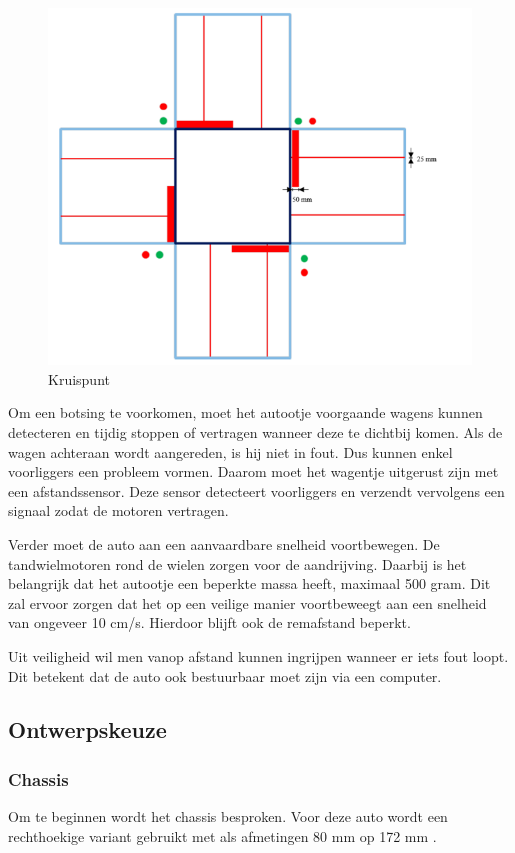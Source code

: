 \documentclass[a4paper,twoside,kulak]{kulakreport} %
\begin{document}
\begin{figure}
	\centering
	\includegraphics[width=.6\textwidth]{volglijnenEnStoplijnen}
	\caption{Kruispunt}
	\label{fig:plattegrond}
\end{figure}

Om een botsing te voorkomen, moet het autootje voorgaande wagens kunnen detecteren en tijdig stoppen of vertragen wanneer deze te dichtbij komen. Als de wagen achteraan wordt aangereden, is hij niet in fout. Dus kunnen enkel voorliggers een probleem vormen. Daarom moet het wagentje uitgerust zijn met een afstandssensor. Deze sensor detecteert voorliggers en verzendt vervolgens een signaal zodat de motoren vertragen. 

Verder moet de auto aan een aanvaardbare snelheid voortbewegen. De tandwielmotoren rond de wielen zorgen voor de aandrijving. Daarbij is het belangrijk dat het autootje een beperkte massa heeft, maximaal 500 gram. Dit zal ervoor zorgen dat het op een veilige manier voortbeweegt aan een snelheid van ongeveer 10 cm/s. Hierdoor blijft ook de remafstand beperkt.

Uit veiligheid wil men vanop afstand kunnen ingrijpen wanneer er iets fout loopt. Dit betekent dat de auto ook bestuurbaar moet zijn via een computer. 



\subsection{Ontwerpskeuze}
\label{Ontwerpskeuze}

\subsubsection{Chassis}
Om te beginnen wordt het chassis besproken. Voor deze auto wordt een rechthoekige variant gebruikt met als afmetingen 80 mm op 172 mm  \cite{RobotChassisRechthoekigZwart}. 
\end{document}
